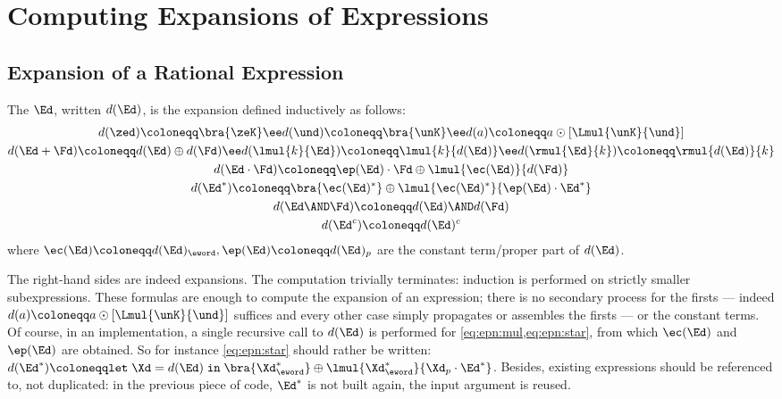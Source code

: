 \documentclass[a4paper,USenglish]{lipics}
\begin{document}
\section{Computing Expansions of Expressions}
\label{sec:expr-to-expa}


\subsection{Expansion of a Rational Expression}
\label{sec:expa-of-expr}
\begin{Definition}
  \label{def:expa-of-expr}
  The  $\Ed$, written $d(\Ed)$, is
  the expansion defined inductively as follows:
  \begin{gather}\label{eq:epn:cst}
    d(\zed) \coloneqq \bra{\zeK} \ee
    d(\und) \coloneqq \bra{\unK} \ee
    d(a)    \coloneqq a \odot [\Lmul{\unK}{\und}]
    \\
    \label{eq:epn:add}
    d(\Ed+\Fd) \coloneqq d(\Ed) \oplus d(\Fd) \ee
    d(\lmul{k}{\Ed}) \coloneqq \lmul{k}{d(\Ed)} \ee
    d(\rmul{\Ed}{k}) \coloneqq \rmul{d(\Ed)}{k}
    \\
    \label{eq:epn:mul}
    d(\Ed \cdot \Fd)  \coloneqq \ep(\Ed)\cdot \Fd \oplus \lmul{\ec(\Ed)}{d(\Fd)}
    \\
    \label{eq:epn:star}
    d(\Ed^*) \coloneqq \bra{\ec(\Ed)^*} \oplus \lmul{\ec(\Ed)^*}{\ep(\Ed) \cdot \Ed^*}
    \\
    \label{eq:epn:and}
    d(\Ed \AND \Fd) \coloneqq d(\Ed) \AND d(\Fd)
    \\
    \label{eq:epn:compl}
    d(\Ed^{c}) \coloneqq d(\Ed)^{c}
  \end{gather}
  where $\ec(\Ed) \coloneqq d(\Ed)_\eword, \ep(\Ed) \coloneqq d(\Ed)_p$ are
  the constant term/proper part of $d(\Ed)$.
\end{Definition}

The right-hand sides are indeed expansions.  The computation trivially
terminates: induction is performed on strictly smaller subexpressions.
These formulas are enough to compute the expansion of an expression; there
is no secondary process for the firsts --- indeed
$d(a) \coloneqq a \odot [\Lmul{\unK}{\und}]$ suffices and every other case
simply propagates or assembles the firsts --- or the constant terms.  Of
course, in an implementation, a single recursive call to $d(\Ed)$ is
performed for \cref{eq:epn:mul,eq:epn:star}, from which $\ec(\Ed)$ and
$\ep(\Ed)$ are obtained.  So for instance \cref{eq:epn:star} should rather
be written:
\begin{math}
  d(\Ed^*)
  \coloneqq
  \mathtt{let}\;
  \Xd = d(\Ed)\;\mathtt{in}\;
  \bra{\Xd_\eword^*}
  \oplus \lmul{\Xd_\eword^*}{\Xd_p \cdot \Ed^*}
\end{math}.  Besides, existing expressions should be referenced to, not
duplicated: in the previous piece of code, $\Ed^*$ is not built again, the
input argument is reused.
\end{document}
